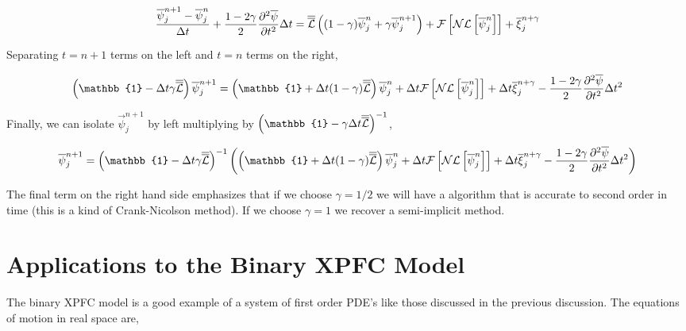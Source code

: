 \begin{equation}
	\frac{\overline{\psi}_j^{n + 1} - \overline{\psi}_j^{n}}{\Delta t}  + \frac{1 - 2\gamma}{2} \frac{\partial^2 \overline{\psi}}{\partial t^2}\Delta t = \overline{\overline{\mathcal{L}}} \left( (1 - \gamma) \overline{\psi}_j^n  + \gamma \overline{\psi}_j^{n+1} \right) + \mathcal{F}\left[\mathcal{NL}\left[ \overline{\psi}_j^{n}\right]\right] + \overline{\xi}_j^{n + \gamma}
\end{equation}

Separating $t=n+1$ terms on the left and $t=n$ terms on the right, 

\begin{equation}
	\left(\mathbb{1} - \Delta t  \gamma \tn{\mathcal{L}}\right) \vec{\psi}_j^{n + 1} 
		= \left(\mathbb{1} + \Delta t (1 - \gamma) \tn{\mathcal{L}}\right) \vec{\psi}_j^n 
		+ \Delta t \mathcal{F}\left[\mathcal{NL}\left[\vec{\psi}_j^n\right]\right] 
		+ \Delta t \vec{\xi}_j^{n + \gamma} 
		- \f{1 - 2\gamma}{2}\f{\partial^2 \vec{\psi}}{\partial t^2}\Delta t^2
\end{equation} 

Finally, we can isolate $\vec{\psi}_j^{n +1}$ by left multiplying by $\left(\mathbb{1} - \gamma \Delta t \tn{\mathcal{L}}\right)^{-1}$, 

\begin{equation}
	\vec{\psi}_j^{n + 1} 
		=  \left(\mathbb{1} - \Delta t  \gamma \tn{\mathcal{L}}\right)^{-1} \left(
			\left(\mathbb{1} + \Delta t (1 - \gamma) \tn{\mathcal{L}}\right) \vec{\psi}_j^n 
			+ \Delta t \mathcal{F}\left[\mathcal{NL}\left[\vec{\psi}_j^n\right]\right] 
			+ \Delta t \vec{\xi}_j^{n + \gamma} 
			- \f{1 - 2\gamma}{2}\f{\partial^2 \vec{\psi}}{\partial t^2}\Delta t^2 
		\right)
\end{equation}

The final term on the right hand side emphasizes that if we choose $\gamma = 1/2$ we will have a algorithm that is accurate to second order in time (this is a kind of Crank-Nicolson method). If we choose $\gamma = 1$ we recover a semi-implicit method. 

\section{Applications to the Binary XPFC Model}

The binary XPFC model is a good example of a system of first order PDE's like those discussed in the previous discussion. The equations of motion in real space are, 

